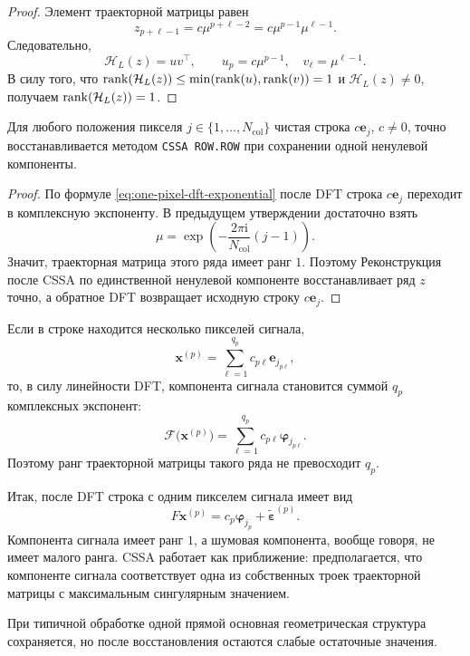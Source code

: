 \begin{proof}
Элемент траекторной матрицы равен
\[
z_{p+\ell-1}=c\mu^{p+\ell-2}
=
c\mu^{p-1}\mu^{\ell-1}.
\]
Следовательно,
\[
\mathcal{H}_L(z)=uv^{\top},
\qquad
u_p=c\mu^{p-1},\quad v_\ell=\mu^{\ell-1}.
\]
В силу того, что
$\operatorname{rank}(\mathcal{H}_L(z)) \le \min(\operatorname{rank}(u), \operatorname{rank}(v)) = 1$ и
$\mathcal{H}_L(z)\ne0$, получаем $\operatorname{rank}(\mathcal{H}_L(z))=1$.
\end{proof}

\begin{corollary}
Для любого положения пикселя $j\in\{1,\dots,N_{\mathrm{col}}\}$ чистая строка
$c\mathbf{e}_j$, $c\ne0$, точно восстанавливается методом
\texttt{CSSA ROW.ROW} при сохранении одной ненулевой компоненты.
\end{corollary}

\begin{proof}
По формуле \eqref{eq:one-pixel-dft-exponential} после DFT строка
$c\mathbf{e}_j$ переходит в комплексную экспоненту.
В предыдущем утверждении достаточно взять
\[
\mu=\exp\!\left(
-\frac{2\pi\mathrm{i}}{N_{\mathrm{col}}}(j-1)
\right).
\]
Значит, траекторная матрица этого ряда имеет ранг $1$. Поэтому
Реконструкция после CSSA по единственной ненулевой компоненте восстанавливает ряд
$z$ точно, а обратное DFT возвращает исходную строку $c\mathbf{e}_j$.
\end{proof}

\begin{remark}
Если в строке находится несколько пикселей сигнала,
\[
\mathbf{x}^{(p)}
=
\sum_{\ell=1}^{q_p} c_{p\ell}\mathbf{e}_{j_{p\ell}},
\]
то, в силу линейности DFT, компонента сигнала становится суммой $q_p$
комплексных экспонент:
\[
\mathcal{F}\bigl(\mathbf{x}^{(p)}\bigr)
=
\sum_{\ell=1}^{q_p} c_{p\ell}\boldsymbol{\varphi}_{j_{p\ell}}.
\]
Поэтому ранг траекторной матрицы такого ряда не превосходит $q_p$.
\end{remark}

Итак, после DFT строка с одним пикселем сигнала имеет вид
\[
F\mathbf{x}^{(p)}
=
c_p\boldsymbol{\varphi}_{j_p}
+
\widetilde{\boldsymbol{\varepsilon}}^{(p)}.
\]
Компонента сигнала имеет ранг $1$, а шумовая компонента, вообще говоря, не имеет
малого ранга. CSSA работает как приближение: предполагается, что компоненте
сигнала соответствует одна из собственных троек траекторной матрицы с
максимальным сингулярным значением.

При типичной обработке одной прямой основная геометрическая структура сохраняется,
но после восстановления остаются слабые остаточные значения.

